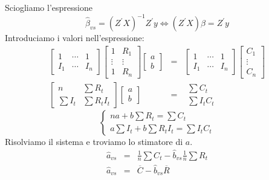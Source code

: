 \documentclass[a4paper]{report}
\theoremstyle{remark}
\begin{document}
\noindent Sciogliamo l'espressione 
\begin{equation*}
\hat{\beta}_{vs}=(Z^{\prime }X)^{-1}Z^{\prime }y\Longleftrightarrow
(Z^{\prime }X){\beta }=Z^{\prime }y
\end{equation*}%
Introduciamo i valori nell'espressione: 
\begin{eqnarray*}
\left[ 
\begin{array}{ccc}
1 & \cdots & 1 \\ 
I_{1} & \cdots & I_{n}%
\end{array}%
\right] \left[ 
\begin{array}{cc}
1 & R_{1} \\ 
\vdots & \vdots \\ 
1 & R_{n}%
\end{array}%
\right] \left[ 
\begin{array}{c}
a \\ 
b%
\end{array}%
\right] &=&\left[ 
\begin{array}{ccc}
1 & \cdots & 1 \\ 
I_{1} & \cdots & I_{n}%
\end{array}%
\right] \left[ 
\begin{array}{c}
C_{1} \\ 
\vdots \\ 
C_{n}%
\end{array}%
\right] \\
\left[ 
\begin{array}{cc}
n & \sum R_{t} \\ 
\sum I_{t} & \sum R_{t}I_{t}%
\end{array}%
\right] \left[ 
\begin{array}{c}
a \\ 
b%
\end{array}%
\right] &=&%
\begin{array}{c}
\sum C_{t} \\ 
\sum I_{t}C_{t}%
\end{array}%
\end{eqnarray*}%
\begin{equation*}
\left\{ 
\begin{array}{c}
na+b\sum R_{t}=\sum C_{t} \\ 
a\sum I_{t}+b\sum R_{t}I_{t}=\sum I_{t}C_{t}%
\end{array}%
\right.
\end{equation*}%
Risolviamo il sistema e troviamo lo stimatore di $a$. 
\begin{eqnarray*}
\widehat{a}_{vs} &=&\frac{1}{n}\sum C_{t}-\widehat{b}_{vs}\frac{1}{n}\sum
R_{t} \\
\widehat{a}_{vs} &=&\overline{C}-\widehat{b}_{vs}\overline{R}
\end{eqnarray*}%
\end{document}
